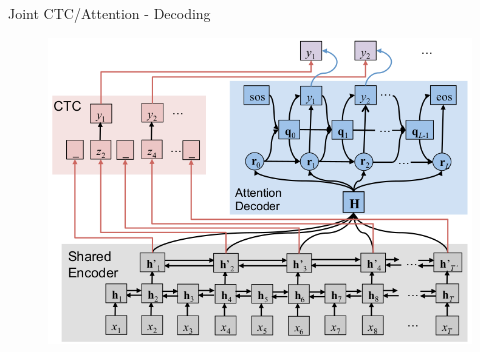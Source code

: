 \documentclass[10pt]{beamer}
\begin{document}
\begin{frame}[fragile]{Joint CTC/Attention - Decoding}
\begin{figure}
	\includegraphics[height=0.8\textheight]{./images/mtl1.png}
\end{figure}	
 
\end{frame}
\end{document}
